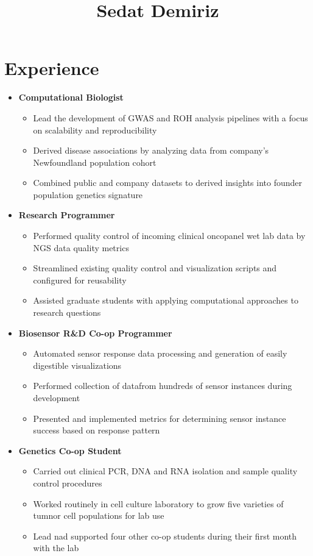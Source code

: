 \documentclass{article}
\title{Sedat Demiriz}
\begin{document}
  \maketitle

\section*{Experience}
\begin{itemize}
  \item[] \textbf{Computational Biologist}
    \begin{itemize}
      \item[] Lead the development of GWAS and ROH analysis pipelines with a focus on scalability and reproducibility
      \item[] Derived disease associations by analyzing data from company's Newfoundland population cohort
      \item[] Combined public and company datasets to derived insights into founder population genetics signature
    \end{itemize}
  \item[] \textbf{Research Programmer}
    \begin{itemize}
      \item[] Performed quality control of incoming clinical oncopanel wet lab data by NGS data quality metrics
      \item[] Streamlined existing quality control and visualization scripts and configured for reusability
      \item[] Assisted graduate students with applying computational approaches to research questions
    \end{itemize}
  \item[] \textbf{Biosensor R\&D Co-op Programmer}
    \begin{itemize}
      \item[] Automated sensor response data processing and generation of easily digestible visualizations
      \item[] Performed collection of datafrom hundreds of sensor instances during development
      \item[] Presented and implemented metrics for determining sensor instance success based on response pattern
    \end{itemize}
  \item[] \textbf{Genetics Co-op Student}
    \begin{itemize}
      \item[] Carried out clinical PCR, DNA and RNA isolation and sample quality control procedures
      \item[] Worked routinely in cell culture laboratory to grow five varieties of tumnor cell populations for lab use
      \item[] Lead nad supported four other co-op students during their first month with the lab
    \end{itemize}
\end{itemize}
\end{document}
